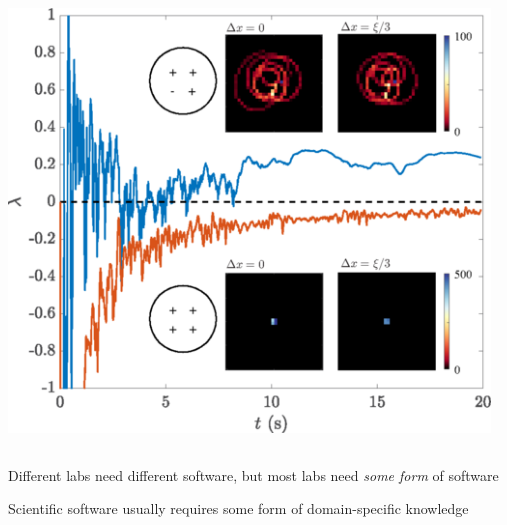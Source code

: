 \documentclass{beamer}
\begin{document}
\begin{frame}
\begin{columns}
\begin{columns}
\includegraphics[width=\textwidth]{lyap.png}
\end{columns}
\begin{columns}
\centering [1]
\centering [2]
\end{columns}
\end{columns}
\begin{center}
\large Different labs need different software, but most labs need \textit{some form} of software

\vspace{0.5cm}
\large Scientific software usually requires some form of domain-specific knowledge
\end{center}
\end{frame}
\end{document}
